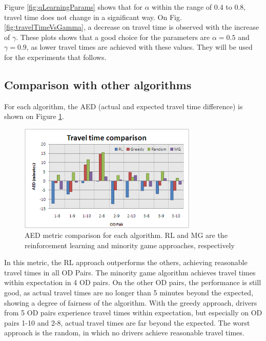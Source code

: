 \documentclass[12pt]{llncs}
\begin{document}
Figure \ref{fig:qLearningParams} shows that for $\alpha$ within the range of 0.4 to 0.8, travel time does not change in a significant way. On Fig. \ref{fig:travelTimeVsGamma}, a decrease on travel time is observed with the increase of $\gamma$. These plots shows that a good choice for the parameters are $\alpha = 0.5$ and $\gamma = 0.9$, as lower travel times are achieved with these values. They will be used for the experiments that follows.

\subsection{Comparison with other algorithms}

For each algorithm, the AED (actual and expected travel time difference) is shown on Figure \ref{fig:travelTimeComparison}. 

\begin{figure}[ht]
    \centerline{\includegraphics[width=8.5cm]{img/travelTimeComparison.png}}
    \caption{AED metric comparison for each algorithm. RL and MG are the reinforcement learning and minority game approaches, respectively}
    \label{fig:travelTimeComparison}
\end{figure}

In this metric, the RL approach outperforms the others, achieving reasonable travel times in all OD Pairs. The minority game algorithm achieves travel times within expectation in 4 OD pairs. On the other OD pairs, the performance is still good, as actual travel times are no longer than 5 minutes beyond the expected, showing a degree of fairness of the algorithm. With the greedy approach, drivers from 5 OD pairs experience travel times within expectation, but especially on OD pairs 1-10 and 2-8, actual travel times are far beyond the expected. The worst approach is the random, in which no drivers achieve reasonable travel times.
\end{document}
